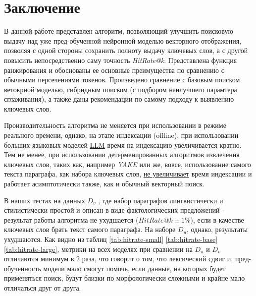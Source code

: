 \section{Заключение}
\label{sec:conclusion}

В данной работе представлен алгоритм, позволяющий улучшить поисковую выдачу над уже пред-обученной нейронной моделью векторного отображения, 
позволяя с одной стороны сохранить полноту выдачу ключевых слов, а с другой повысить непосредственно саму точность \textit{HitRate@k}. Представлена функция ранжирования и 
обоснованы ее основные преимущества по сравнению с обычными персечениями токенов. Произведено сравнение с базовым поиском ветокрной моделью, гибридным поиском (с подбором наилучшего парамтера сглаживания), 
а также даны рекомендации по самому подходу к выявлению ключевых слов.

Производительность алгоритма не меняется при использовании в режиме реального времени, однако, на этапе индексации (offline), при использовании 
больших языковых моделей \href{https://en.wikipedia.org/wiki/Large_language_model}{LLM} время на индексацию увеличивается кратно. Тем не менее, при использовании детерменированных алгоритмов извлечения ключевых слов, 
таких как, например \textit{YAKE} \cite{YAKE} или же, вовсе, использование самого текста параграфа, как набора ключевых слов, \underline{не увеличивает} время индексации и работает асимптотически также, как и обычный векторный поиск.

В наших тестах на данных $D_v$ \cite{}, где набор параграфов лингвистически и стилистически простой и описан в виде фактологических предложений - результат работы алгоритма не ухудшается ($HitRate@k \pm 1\%$), если в качестве ключевых слов брать текст самого параграфа. 
На наборе $D_u$, однако, результаты ухудшаются. Как видно из таблиц \ref{tab:hitrate-small} \ref{tab:hitrate-base} \ref{tab:hitrate-large}, метрики на всех моделях при сравнении на $D_u$ и $D_v$ отличаются минимум в $2$ раза, что говорит о том, что лексический сдвиг и, пред-обученность модели мало смогут помочь, 
если данные, на которых будет применяться поиск, будут близки по морфологически сложными и крайне мало отличаться друг от друга.